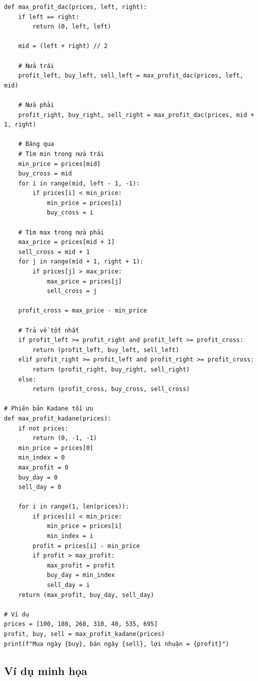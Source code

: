 \documentclass{article}
\begin{document}
\begin{verbatim}
def max_profit_dac(prices, left, right):
    if left == right:
        return (0, left, left)
    
    mid = (left + right) // 2
    
    # Nửa trái
    profit_left, buy_left, sell_left = max_profit_dac(prices, left, mid)
    
    # Nửa phải
    profit_right, buy_right, sell_right = max_profit_dac(prices, mid + 1, right)
    
    # Băng qua
    # Tìm min trong nửa trái
    min_price = prices[mid]
    buy_cross = mid
    for i in range(mid, left - 1, -1):
        if prices[i] < min_price:
            min_price = prices[i]
            buy_cross = i
    
    # Tìm max trong nửa phải
    max_price = prices[mid + 1]
    sell_cross = mid + 1
    for j in range(mid + 1, right + 1):
        if prices[j] > max_price:
            max_price = prices[j]
            sell_cross = j
    
    profit_cross = max_price - min_price
    
    # Trả về tốt nhất
    if profit_left >= profit_right and profit_left >= profit_cross:
        return (profit_left, buy_left, sell_left)
    elif profit_right >= profit_left and profit_right >= profit_cross:
        return (profit_right, buy_right, sell_right)
    else:
        return (profit_cross, buy_cross, sell_cross)

# Phiên bản Kadane tối ưu
def max_profit_kadane(prices):
    if not prices:
        return (0, -1, -1)
    min_price = prices[0]
    min_index = 0
    max_profit = 0
    buy_day = 0
    sell_day = 0
    
    for i in range(1, len(prices)):
        if prices[i] < min_price:
            min_price = prices[i]
            min_index = i
        profit = prices[i] - min_price
        if profit > max_profit:
            max_profit = profit
            buy_day = min_index
            sell_day = i
    return (max_profit, buy_day, sell_day)

# Ví dụ
prices = [100, 180, 260, 310, 40, 535, 695]
profit, buy, sell = max_profit_kadane(prices)
print(f"Mua ngày {buy}, bán ngày {sell}, lợi nhuận = {profit}")
\end{verbatim}

\subsection{Ví dụ minh họa}
\end{document}
